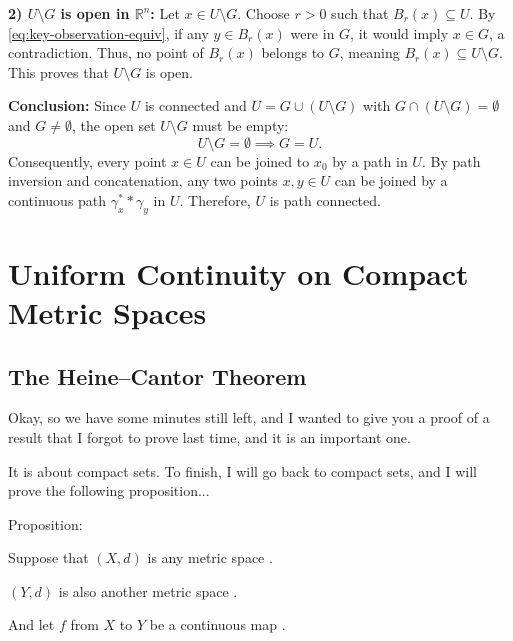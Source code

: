 \begin{proofWrapper}
\begin{content}
\textbf{2) $U \setminus G$ is open in $\mathbb{R}^n$:}
Let $x \in U \setminus G$. Choose $r > 0$ such that $B_r(x) \subseteq U$. By \eqref{eq:key-observation-equiv}, if any $y \in B_r(x)$ were in $G$, it would imply $x \in G$, a contradiction. Thus, no point of $B_r(x)$ belongs to $G$, meaning $B_r(x) \subseteq U \setminus G$. This proves that $U \setminus G$ is open.

\textbf{Conclusion:}
Since $U$ is connected and $U = G \cup (U \setminus G)$ with $G \cap (U \setminus G) = \emptyset$ and $G \neq \emptyset$, the open set $U \setminus G$ must be empty:
\[
U \setminus G = \emptyset \implies G = U.
\]
Consequently, every point $x \in U$ can be joined to $x_0$ by a path in $U$. By path inversion and concatenation, any two points $x, y \in U$ can be joined by a continuous path $\gamma_x^* * \gamma_y$ in $U$. Therefore, $U$ is path connected.
\end{content}

\end{proofWrapper}

\section{Uniform Continuity on Compact Metric Spaces}

\subsection{The Heine--Cantor Theorem}

\begin{speech}[01:11:57 - 01:13:20]
Okay, so we have some minutes still left, and I wanted to give you a proof of a result that I forgot to prove last time, and it is an important one.

It is about compact sets. To finish, I will go back to compact sets, and I will prove the following proposition...


Proposition:

Suppose that $(X, d)$ is any metric space .

$(Y, d)$ is also another metric space .

And let $f$ from $X$ to $Y$ be a continuous map .
\end{speech}

